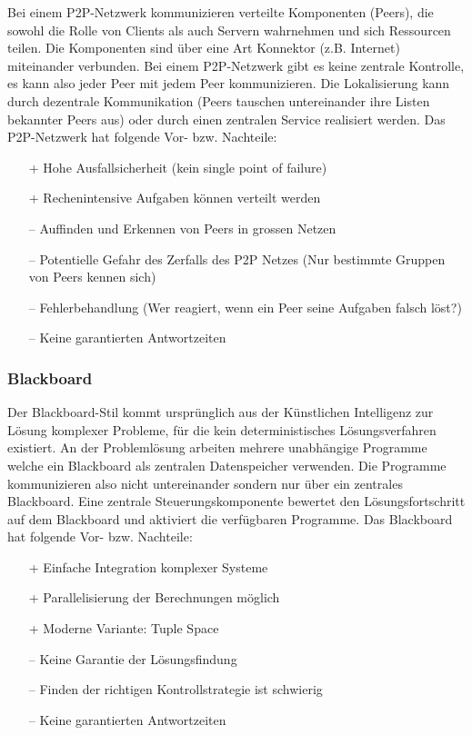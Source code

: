 Bei einem P2P-Netzwerk kommunizieren verteilte Komponenten (Peers), die sowohl die Rolle von Clients als auch Servern wahrnehmen und sich Ressourcen teilen. Die Komponenten sind über eine Art Konnektor (z.B. Internet) miteinander verbunden. Bei einem P2P-Netzwerk gibt es keine zentrale Kontrolle, es kann also jeder Peer mit jedem Peer kommunizieren. Die Lokalisierung kann durch dezentrale Kommunikation (Peers tauschen untereinander ihre Listen bekannter Peers aus) oder durch einen zentralen Service realisiert werden. Das P2P-Netzwerk hat folgende Vor- bzw. Nachteile:
\begin{itemize}
	\item[+] Hohe Ausfallsicherheit (kein single point of failure)
	\item[+] Rechenintensive Aufgaben können verteilt werden
	\item[--] Auffinden und Erkennen von Peers in grossen Netzen
	\item[--] Potentielle Gefahr des Zerfalls des P2P Netzes (Nur bestimmte Gruppen von Peers kennen sich)
	\item[--] Fehlerbehandlung (Wer reagiert, wenn ein Peer seine Aufgaben falsch löst?)
	\item[--] Keine garantierten Antwortzeiten
\end{itemize}

\subsubsection{Blackboard}

Der Blackboard-Stil kommt ursprünglich aus der Künstlichen Intelligenz zur Lösung komplexer Probleme, für die kein deterministisches Lösungsverfahren existiert. An der Problemlösung arbeiten mehrere unabhängige Programme welche ein Blackboard als zentralen Datenspeicher verwenden. Die Programme kommunizieren also nicht untereinander sondern nur über ein zentrales Blackboard. Eine zentrale Steuerungskomponente bewertet den Lösungsfortschritt auf dem Blackboard und aktiviert die verfügbaren Programme. Das Blackboard hat folgende Vor- bzw. Nachteile:
\begin{itemize}
	\item[+] Einfache Integration komplexer Systeme
	\item[+] Parallelisierung der Berechnungen möglich
	\item[+] Moderne Variante: Tuple Space
	\item[--] Keine Garantie der Lösungsfindung
	\item[--] Finden der richtigen Kontrollstrategie ist schwierig
	\item[--] Keine garantierten Antwortzeiten
\end{itemize}

